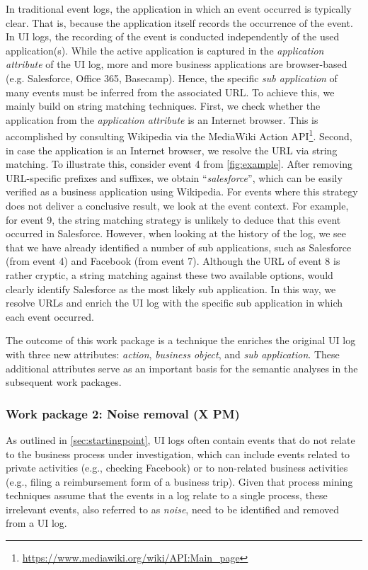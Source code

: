  In traditional event logs, the application in which an event occurred is typically clear. That is, because the application itself records the occurrence of the event. In UI logs, the recording of the event is conducted independently of the used application(s). While the active application is captured in the \textit{application attribute} of the UI log, more and more business applications are browser-based (e.g. Salesforce, Office 365, Basecamp). Hence, the specific \textit{sub application} of many events must be inferred from the associated URL. To achieve this, we mainly build on string matching techniques. First, we check whether the application from the \textit{application attribute} is an Internet browser. This is accomplished by consulting Wikipedia via the MediaWiki Action API\footnote{\url{https://www.mediawiki.org/wiki/API:Main_page}}. Second, in case the application is an Internet browser, we resolve the URL via string matching. To illustrate this, consider event 4 from \autoref{fig:example}. After removing URL-specific prefixes and suffixes, we obtain ``\textit{salesforce}'', which can be easily verified as a business application using Wikipedia. For events where this strategy does not deliver a conclusive result, we look at the event context. For example, for event 9, the string matching strategy is unlikely to deduce that this event occurred in Salesforce. However, when looking at the history of the log, we see that we have already identified a number of sub applications, such as Salesforce (from event 4) and Facebook (from event 7). Although the URL of event 8 is rather cryptic, a string matching against these two available options, would clearly identify Salesforce as the most likely sub application. In this way, we resolve URLs and enrich the UI log with the specific sub application in which each event occurred.  

 The outcome of this work package is a technique the enriches the original UI log with three new attributes: \textit{action}, \textit{business object}, and \textit{sub application}. These additional attributes serve as an important basis for the semantic analyses in the subsequent work packages.  


\subsubsection{Work package 2:  Noise removal (X PM)}
\label{sec:wp2}

As outlined in \autoref{sec:startingpoint}, UI logs often contain events that do not relate to the business process under investigation, which can include events related to private activities (e.g., checking Facebook) or to non-related business activities (e.g., filing a reimbursement form of a business trip).
Given that process mining techniques assume that the events in a log relate to a single process, these irrelevant events, also referred to as \emph{noise}, need to be identified and removed from a UI log.

